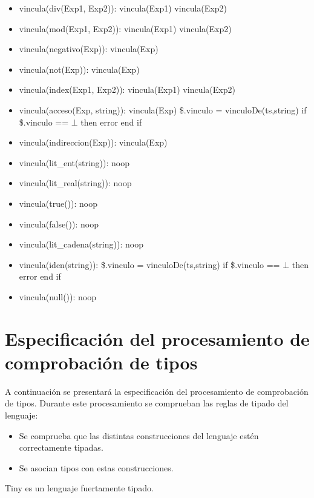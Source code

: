 \documentclass[11pt]{article}
\begin{document}
\begin{itemize}
                \item vincula(div(Exp1, Exp2)): 
                    \subitem vincula(Exp1) 
                    \subitem vincula(Exp2)
                \item vincula(mod(Exp1, Exp2)): 
                    \subitem vincula(Exp1) 
                    \subitem vincula(Exp2)
                \item vincula(negativo(Exp)): 
                    \subitem vincula(Exp)
                \item vincula(not(Exp)): 
                    \subitem vincula(Exp)
                \item vincula(index(Exp1, Exp2)): 
                    \subitem vincula(Exp1) 
                    \subitem vincula(Exp2)
                \item vincula(acceso(Exp, string)): 
                    \subitem vincula(Exp) 
                    \subitem \$.vinculo = vinculoDe(ts,string) 
                    \subitem if \$.vinculo == $\bot$ then 
                        \subsubitem error 
                    \subitem end if
                \item vincula(indireccion(Exp)): 
                    \subitem vincula(Exp)
                \item vincula(lit\_ent(string)): 
                    \subitem noop
                \item vincula(lit\_real(string)): 
                    \subitem noop
                \item vincula(true()): 
                    \subitem noop
                \item vincula(false()): 
                    \subitem noop
                \item vincula(lit\_cadena(string)): 
                    \subitem noop
                \item vincula(iden(string)): 
                    \subitem \$.vinculo = vinculoDe(ts,string) 
                    \subitem if \$.vinculo == $\bot$ then 
                        \subsubitem error 
                    \subitem end if
                \item vincula(null()): 
                    \subitem noop
            \end{itemize}

    
    \section{Especificación del procesamiento de comprobación de tipos}
        A continuación se presentará la especificación del procesamiento de comprobación de tipos. Durante este procesamiento se comprueban las reglas de tipado del lenguaje:
        \begin{itemize}
            \item Se comprueba que las distintas construcciones del lenguaje estén
            correctamente tipadas.
            \item Se asocian tipos con estas construcciones.
        \end{itemize}
        Tiny es un lenguaje fuertamente tipado. 
        
\end{document}
